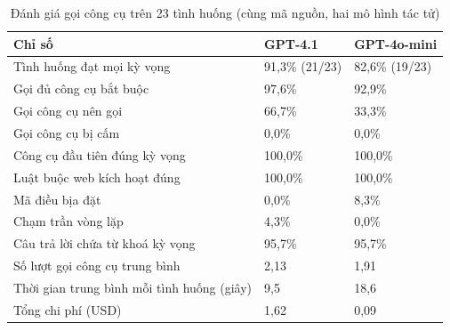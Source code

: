 \begin{table}[H]
\centering
\small
\caption{Đánh giá gọi công cụ trên 23 tình huống (cùng mã nguồn, hai mô hình tác tử)}
\label{tab:pl_tool}
\begin{tabular}{|L{7.4cm}|L{2.9cm}|L{2.9cm}|}
\hline
\textbf{Chỉ số} & \textbf{GPT-4.1} & \textbf{GPT-4o-mini} \\ \hline
Tình huống đạt mọi kỳ vọng & 91{,}3\% (21/23) & 82{,}6\% (19/23) \\ \hline
Gọi đủ công cụ bắt buộc & 97{,}6\% & 92{,}9\% \\ \hline
Gọi công cụ nên gọi & 66{,}7\% & 33{,}3\% \\ \hline
Gọi công cụ bị cấm & 0{,}0\% & 0{,}0\% \\ \hline
Công cụ đầu tiên đúng kỳ vọng & 100{,}0\% & 100{,}0\% \\ \hline
Luật buộc web kích hoạt đúng & 100{,}0\% & 100{,}0\% \\ \hline
Mã điều bịa đặt & 0{,}0\% & 8{,}3\% \\ \hline
Chạm trần vòng lặp & 4{,}3\% & 0{,}0\% \\ \hline
Câu trả lời chứa từ khoá kỳ vọng & 95{,}7\% & 95{,}7\% \\ \hline
Số lượt gọi công cụ trung bình & 2{,}13 & 1{,}91 \\ \hline
Thời gian trung bình mỗi tình huống (giây) & 9{,}5 & 18{,}6 \\ \hline
Tổng chi phí (USD) & 1{,}62 & 0{,}09 \\ \hline
\end{tabular}
\end{table}
